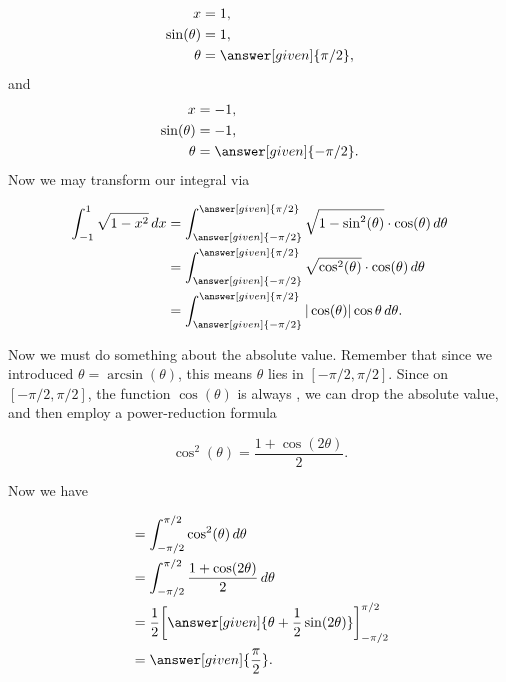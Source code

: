 \documentclass{ximera}
\begin{document}
\begin{example}
\begin{explanation}
    \begin{align*}
      x &= 1,\\
      \sin(\theta) &= 1,\\
      \theta &= \answer[given]{\pi/2},
    \end{align*}
    and
    \begin{align*}
      x &= -1,\\
      \sin(\theta) &= -1,\\
      \theta &= \answer[given]{-\pi/2}.
    \end{align*}
    Now we may transform our integral via
    \begin{image}
    \end{image}
    \begin{align*}
      \int_{-1}^1\sqrt{1-x^2} \d x &= \int_{\answer[given]{-\pi/2}}^{\answer[given]{\pi/2}} \sqrt{1-\sin^2(\theta)} \cdot \cos(\theta) \d \theta \\
      &= \int_{\answer[given]{-\pi/2}}^{\answer[given]{\pi/2}} \sqrt{\cos^2(\theta)}\cdot \cos(\theta) \d\theta \\
      &=\int_{\answer[given]{-\pi/2}}^{\answer[given]{\pi/2}} |\cos(\theta)| \cos\theta \d\theta.
    \end{align*}
    
Now we must do something about the absolute value. Remember that since we 
introduced $\theta=\arcsin(\theta)$, this means $\theta$ lies in $[- \pi/2, \pi/2 ]$. 
Since on $[-\pi/2,\pi/2]$, the function $\cos(\theta)$ is always
    ,
    we can drop the absolute value, and then employ a power-reduction
    formula

    \[
    \cos^2(\theta)= \frac{1+\cos(2\theta)}{2}.
    \]

    Now we have

    \begin{align*}
      &= \int_{-\pi/2}^{\pi/2} \cos^2(\theta) \d \theta \\
      &= \int_{-\pi/2}^{\pi/2} \frac{1+\cos(2\theta)}{2} \d \theta\\
      &= \frac{1}{2} \eval{\answer[given]{\theta +\frac{1}{2}\sin(2\theta)}}_{-\pi/2}^{\pi/2}\\
      &=\answer[given]{\frac{\pi}{2}}.
    \end{align*}


\end{explanation}
\end{example}
\end{document}

